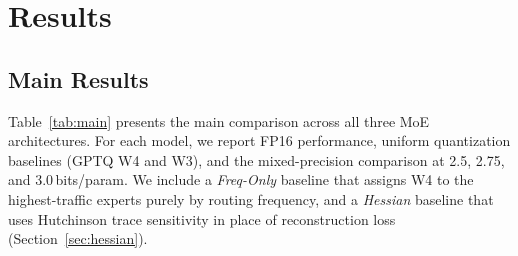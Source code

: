 \section{Results}
\label{sec:results}

\subsection{Main Results}

\FloatBarrier
Table~\ref{tab:main} presents the main comparison across all three MoE architectures. For each model, we report FP16 performance, uniform quantization baselines (GPTQ W4 and W3), and the mixed-precision comparison at 2.5, 2.75, and 3.0\,bits/param. We include a \emph{Freq-Only} baseline that assigns W4 to the highest-traffic experts purely by routing frequency, and a \emph{Hessian} baseline that uses Hutchinson trace sensitivity in place of reconstruction loss (Section~\ref{sec:hessian}).

